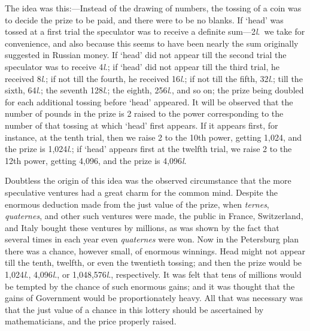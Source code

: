 \documentclass[letterpaper,12pt,oneside,openany]{memoir}
\begin{document}
The idea was this:---Instead of the drawing of
numbers, the tossing of a coin was to decide the prize
to be paid, and there were to be no blanks. If `head'
was tossed at a first trial the speculator was to receive
a definite sum---2\textit{l}.\ we take for convenience, and also
because this seems to have been nearly the sum originally
suggested in Russian money. If `head' did not
appear till the second trial the speculator was to receive
4\textit{l}.; if `head' did not appear till the third trial, he received
8\textit{l}.; if not till the fourth, he received 16\textit{l}.; if
not till the fifth, 32\textit{l}.; till the sixth, 64\textit{l}.; the seventh
128\textit{l}.; the eighth, 256\textit{l}., and so on; the prize being
doubled for each additional tossing before `head'
appeared. It will be observed that the number of
pounds in the prize is 2 raised to the power corresponding
to the number of that tossing at which `head' first
appears. If it appears first, for instance, at the
tenth trial, then we raise 2 to the 10th power, getting
1,024, and the prize is 1,024\textit{l}.; if `head' appears first
at the twelfth trial, we raise 2 to the 12th power, getting
4,096, and the prize is 4,096\textit{l}.

Doubtless the origin of this idea was the observed
circumstance that the more speculative ventures had
a great charm for the common mind. Despite the
enormous deduction made from the just value of the
prize, when \textit{ternes}, \textit{quaternes}, and other such ventures
were made, the public in France, Switzerland, and Italy
bought these ventures by millions, as was shown by the
fact that several times in each year even \textit{quaternes} were
won. Now in the Petersburg plan there was a chance,
however small, of enormous winnings. Head might
not appear till the tenth, twelfth, or even the twentieth
tossing; and then the prize would be 1,024\textit{l}., 4,096\textit{l}.,
or 1,048,576\textit{l}., respectively. It was felt that tens of
millions would be tempted by the chance of such enormous
gains; and it was thought that the gains of
Government would be proportionately heavy. All that
was necessary was that the just value of a chance
in this lottery should be ascertained by mathematicians,
and the price properly raised.
\end{document}
